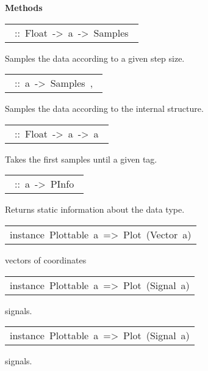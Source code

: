 \begin{haddockdesc}
\haddockpremethods{}\textbf{Methods}
\begin{haddockdesc}
\item[\begin{tabular}{@{}l}\haddockid{sample}\ ::\ Float\ ->\ a\ ->\ Samples\ \end{tabular}]
\haddockbegindoc
Samples the data according to a given step size.\par

\item[\begin{tabular}{@{}l}\haddockid{sample}\ ::\ a\ ->\ Samples\ ,\ \end{tabular}]
\haddockbegindoc
Samples the data according to the internal structure.\par

\item[\begin{tabular}{@{}l}\haddockid{takeUntil}\ ::\ Float\ ->\ a\ ->\ a\ \end{tabular}]
\haddockbegindoc
Takes the first samples until a given tag.\par

\item[\begin{tabular}{@{}l}\haddockid{getInfo}\ ::\ a\ ->\ PInfo\ \end{tabular}]
\haddockbegindoc
Returns static information about the data type.\par

\end{haddockdesc}


\item[\begin{tabular}{@{}l}
instance\ Plottable\ a\ =>\ Plot\ (Vector\ a)
\end{tabular}]\haddockbegindoc
vectors of coordinates\par


\item[\begin{tabular}{@{}l}
instance\ Plottable\ a\ =>\ Plot\ (Signal\ a)
\end{tabular}]\haddockbegindoc
{} signals.\par


\item[\begin{tabular}{@{}l}
instance\ Plottable\ a\ =>\ Plot\ (Signal\ a)
\end{tabular}]\haddockbegindoc
{} signals.\par



\end{haddockdesc}
